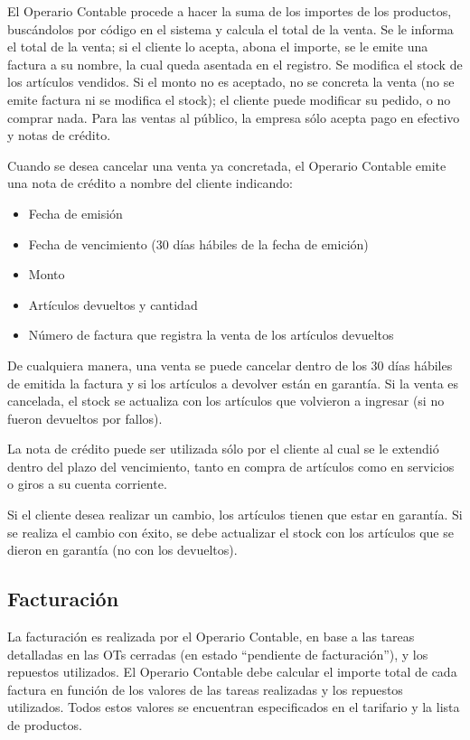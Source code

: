 \documentclass[12pt]{extarticle}
\begin{document}
\begin{spacing}{1.2}
    El Operario Contable procede a hacer la suma de los importes de los productos, buscándolos por código en el sistema y calcula el total de la venta. Se le informa el total de la venta; si el cliente lo acepta, abona el importe, se le emite una factura a su nombre, la cual queda asentada en el registro. Se modifica el stock de los artículos vendidos. 
    Si el monto no es aceptado, no se concreta la venta (no se emite factura ni se modifica el stock); el cliente puede modificar su pedido, o no comprar nada.
    Para las ventas al público, la empresa sólo acepta pago en efectivo y notas de crédito.

    Cuando se desea cancelar una venta ya concretada, el Operario Contable emite una nota de crédito a nombre del cliente indicando:
    \begin{itemize}
        \item Fecha de emisión
        \item Fecha de vencimiento (30 días hábiles de la fecha de emición)
        \item Monto
        \item Artículos devueltos y cantidad
        \item Número de factura que registra la venta de los artículos devueltos
    \end{itemize}
    De cualquiera manera, una venta se puede cancelar dentro de los 30 días hábiles de emitida la factura y si los artículos a devolver están en garantía. Si la venta es cancelada, el stock se actualiza con los artículos que volvieron a ingresar (si no fueron devueltos por fallos).

    La nota de crédito puede ser utilizada sólo por el cliente al cual se le extendió dentro del plazo del vencimiento, tanto en compra de artículos como en servicios o giros a su cuenta corriente.

    Si el cliente desea realizar un cambio, los artículos tienen que estar en garantía. Si se realiza el cambio con éxito, se debe actualizar el stock con los artículos que se dieron en garantía (no con los devueltos).

    \subsection{Facturación}


    La facturación es realizada por el Operario Contable, en base a las tareas detalladas en las OTs{} cerradas (en estado ``pendiente de facturación''), y los repuestos utilizados. El Operario Contable debe calcular el importe total de cada factura en función de los valores de las tareas realizadas y los repuestos utilizados. Todos estos valores se encuentran especificados en el tarifario y la lista de productos.
    

\end{spacing}
\end{document}
